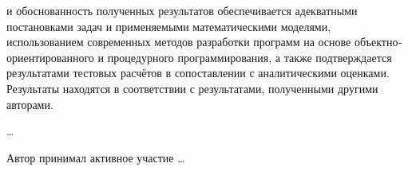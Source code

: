 {\reliability} и обоснованность полученных результатов обеспечивается адекватными постановками задач и применяемыми математическими моделями, использованием современных методов разработки программ на основе объектно­ ориентированного и проце­дурного программирования, а также подтверждается результатами тестовых расчётов в сопоставлении с аналитическими оценками. Результаты находятся в соответствии с результатами, полученными другими авторами.

{\probation} \ldots

{\contribution} Автор принимал активное участие \ldots

